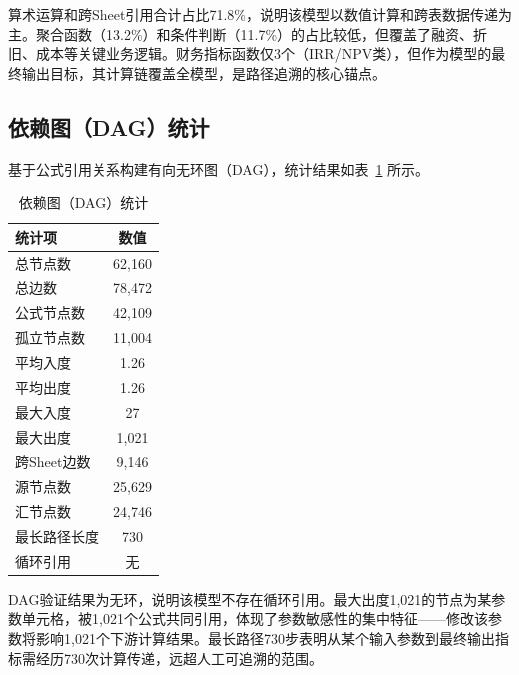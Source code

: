 算术运算和跨Sheet引用合计占比71.8\%，说明该模型以数值计算和跨表数据传递为主。聚合函数（13.2\%）和条件判断（11.7\%）的占比较低，但覆盖了融资、折旧、成本等关键业务逻辑。财务指标函数仅3个（IRR/NPV类），但作为模型的最终输出目标，其计算链覆盖全模型，是路径追溯的核心锚点。

\subsection{\heiti 依赖图（DAG）统计}

基于公式引用关系构建有向无环图（DAG），统计结果如表~\ref{tab:dag_stats} 所示。

\begin{table}[H]
	\centering
	\caption{依赖图（DAG）统计}
	\label{tab:dag_stats}
	\vspace {-2.5mm}
	\begin{center}
		\begin{tabular}{lc}
			\toprule
			统计项 & 数值 \\
			\hline
			总节点数 & 62,160 \\
			总边数 & 78,472 \\
			公式节点数 & 42,109 \\
			孤立节点数 & 11,004 \\
			平均入度 & 1.26 \\
			平均出度 & 1.26 \\
			最大入度 & 27 \\
			最大出度 & 1,021 \\
			跨Sheet边数 & 9,146 \\
			源节点数 & 25,629 \\
			汇节点数 & 24,746 \\
			最长路径长度 & 730 \\
			循环引用 & 无 \\
			\bottomrule
		\end{tabular}
	\end{center}
\end{table}

DAG验证结果为无环，说明该模型不存在循环引用。最大出度1,021的节点为某参数单元格，被1,021个公式共同引用，体现了参数敏感性的集中特征——修改该参数将影响1,021个下游计算结果。最长路径730步表明从某个输入参数到最终输出指标需经历730次计算传递，远超人工可追溯的范围。
